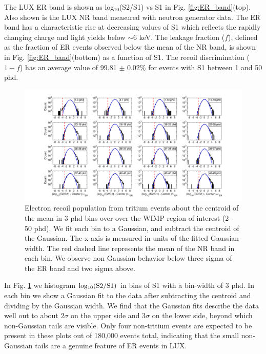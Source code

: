 The LUX ER band is shown as log$_{10}$(S2/S1) vs S1 in Fig. \ref{fig:ER_band}(top).  Also shown is the LUX NR band measured with neutron generator data\cite{DD-paper, lux-reanalysis}. The ER band has a characteristic rise at decreasing values of S1 which reflects the rapidly changing charge and light yields below $\sim$6 keV. The leakage fraction ($f$), defined as the fraction of ER events observed below the mean of the NR band, is shown in Fig. \ref{fig:ER_band}(bottom) as a function of S1. The recoil discrimination ($1-f$) has an average value of 99.81 $\pm$ 0.02\% for events with S1 between 1 and 50 phd.


\onecolumngrid
\break
\begin{figure}\centering
\includegraphics[width=220mm]{fig/Gaussianity/GaussER_all.png}
\caption{Electron recoil population from tritium events about the centroid of the mean in 3 phd bins over over the WIMP region of interest (2 - 50 phd). We fit each bin to a Gaussian, and subtract the centroid of the Gaussian. The x-axis is measured in units of the fitted Gaussian width. The red dashed line represents the mean of the NR band in each bin. We observe non Gaussian behavior below three sigma of the ER band and two sigma above.  }
\label{fig:ER-Gauss}
\end{figure}
\twocolumngrid

In Fig. \ref{fig:ER-Gauss} we histogram $\rm log_{10}(S2/S1)$ in bins of S1 with a bin-width of 3 phd. In each bin we show a Gaussian fit to the data after subtracting the centroid and dividing by the Gaussian width. We find that the Gaussian fits describe the data well out to about $2\sigma$ on the upper side and $3\sigma$ on the lower side, beyond which non-Gaussian tails are visible. Only four non-tritium events are expected to be present in these plots out of 180,000 events total, indicating that the small non-Gaussian tails are a genuine feature of ER events in LUX.   

